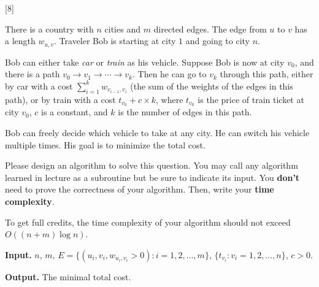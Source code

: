 [8]

There is a country with $n$ cities and $m$ directed edges. The edge from $u$ to $v$ has a length $w_{u,v}$.
Traveler Bob is starting at city $1$ and going to city $n$.

Bob can either take \emph{car} or \emph{train} as his vehicle.
Suppose Bob is now at city $v_0$, and there is a path $v_0\rightarrow v_1\rightarrow \cdots \rightarrow v_k$.
Then he can go to $v_k$ through this path, either by car with a cost $\sum_{i=1}^k w_{v_{i-1}, v_i}$ (the sum of the weights of the edges in this path), or by train with a cost $t_{v_0} + c\times k$, where $t_{v_0}$ is the price of train ticket at city $v_0$, $c$ is a constant, and $k$ is the number of edges in this path.

Bob can freely decide which vehicle to take at any city. He can switch his vehicle multiple times. His goal is to minimize the total cost.

Please design an algorithm to solve this question. You may call any algorithm learned in lecture as a subroutine but be sure to indicate its input. You \textbf{don't} need to prove the correctness of your algorithm. Then, write your \textbf{time complexity}.

To get full credits, the time complexity of your algorithm should not exceed $O\left(\left(n + m\right) \log n\right)$.

\textbf{Input. } $n$, $m$, $E=\{(u_i,v_i,w_{u_i,v_i}>0):i=1,2,\ldots, m\}$, $\{t_{v_i}: v_i=1,2,\ldots, n\}$, $c>0$.

\textbf{Output. } The minimal total cost.

